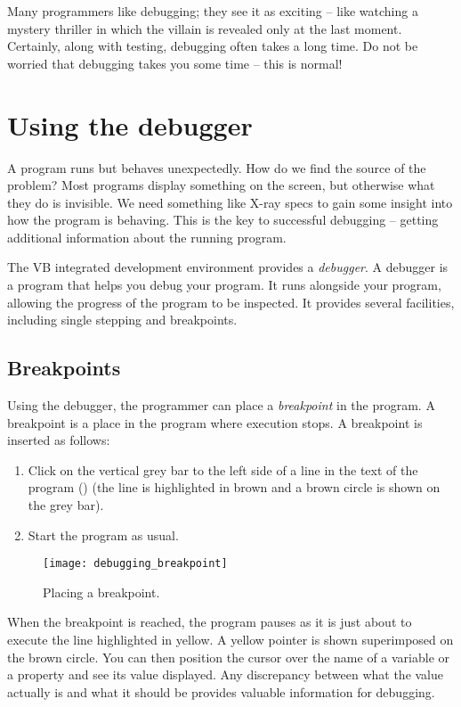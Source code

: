 			Many programmers like debugging; they see it as exciting – like watching a mystery thriller in which the villain is revealed only at the last moment. Certainly, along with testing, debugging often takes a long time. Do not be worried that debugging takes you some time – this is normal!

			
	\section{Using the debugger}
		A program runs but behaves unexpectedly. How do we find the source of the problem? Most programs display something on the screen, but otherwise what they do is invisible. We need something like X-ray specs to gain some insight into how the program is behaving. This is the key to successful debugging – getting additional information about the running program.
		
		The VB integrated development environment provides a \emph{debugger}. A debugger is a program that helps you debug your program. It runs alongside your program, allowing the progress of the program to be inspected. It provides several facilities, including single stepping and breakpoints.
		

		\subsection*{Breakpoints}
			Using the debugger, the programmer can place a \emph{breakpoint} in the program. A breakpoint is a place in the program where execution stops. A breakpoint is inserted as follows:
			\begin{enumerate}
				\item	Click on the vertical grey bar to the left side of a line in the text of the program () (the line is highlighted in brown and a brown circle is shown on the grey bar).
				\item	Start the program as usual.
			\end{enumerate}
			\begin{figure}[bth]
				\centering
				\texttt{[image: debugging\_breakpoint]}
				\caption{Placing a breakpoint.}
				\label{fig:debugging_breakpoint}
			\end{figure}
			When the breakpoint is reached, the program pauses as it is just about to execute the line highlighted in yellow. A yellow pointer is shown superimposed on the brown circle. You can then position the cursor over the name of a variable or a property and see its value displayed. Any discrepancy between what the value actually is and what it should be provides valuable information for debugging.
			
